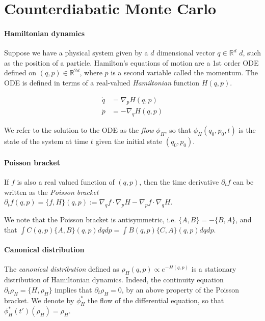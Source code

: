 \documentclass{article}
\begin{document}





\section{Counterdiabatic Monte Carlo}

\paragraph{Hamiltonian dynamics}

Suppose we have a physical system given by a $d$ dimensional vector $q \in \mathbb{R}^d$ $d$, such as the position of a particle. Hamilton's equations of motion are a 1st order ODE defined on $(q,p) \in \mathbb{R}^{2d}$, where $p$ is a second variable called the momentum. The ODE is defined in terms of a real-valued \emph{Hamiltonian} function $H(q,p)$.

\begin{align}
\dot{q} &= \nabla_p H(q,p) \\
\dot{p} &= -\nabla_q H(q,p)
\end{align}

We refer to the solution to the ODE as the \emph{flow} $\phi_H$, so that $\phi_H(q_0,p_0,t)$ is the state of the system at time $t$ given the initial state $(q_0,p_0)$.


\paragraph{Poisson bracket} If $f$ is also a real valued function of $(q,p)$, then the time derivative $\partial_tf$ can be written as the \emph{Poisson bracket} $\partial_tf(q,p) = \{f, H\}(q,p) := \nabla_q f \cdot \nabla_p H - \nabla_p f \cdot \nabla_q H$.

We note that the Poisson bracket is antisymmetric, i.e. $\{A, B\} = -\{B, A\}$, and that $\int C(q,p) \{A, B\}(q,p) dqdp = \int B(q,p) \{C, A\}(q,p) dqdp$.

\paragraph{Canonical distribution} The \emph{canonical distribution} defined as $\rho_H(q,p) \propto e^{-H(q,p)}$ is a stationary distribution of Hamiltonian dynamics. Indeed, the continuity equation $\partial_t\rho_H = \{H, \rho_H\}$ implies that $\partial_t\rho_H = 0$, by an above property of the Poisson bracket. We denote by $\phi^*_H$ the flow of the differential equation, so that $\phi^*_H(t')(\rho_H) = \rho_H$.
\end{document}
